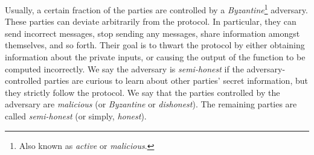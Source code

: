 \documentclass[10pt]{article}
\theoremstyle{plain}
\begin{document}
Usually, a certain fraction of the parties are controlled by a \textit{Byzantine}\footnote{Also known as \emph{active} or \emph{malicious}.}
adversary. These parties can deviate arbitrarily from the protocol.
In particular, they can send incorrect messages, stop sending any
messages, share information amongst themselves, and so forth. Their
goal is to thwart the protocol by either obtaining information about
the private inputs, or causing the output of the function to be computed
incorrectly. We say the adversary is \emph{semi-honest} if the adversary-controlled
parties are curious to learn about other parties' secret information,
but they strictly follow the protocol. We say that the parties controlled
by the adversary are \emph{malicious} (or \emph{Byzantine} or \emph{dishonest}).
The remaining parties are called \emph{semi-honest} (or simply, \emph{honest}).
\end{document}
